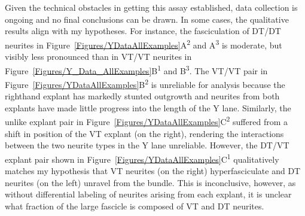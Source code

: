 Given the technical obstacles in getting this assay established, data collection is ongoing and no final conclusions can be drawn.
In some cases, the qualitative results align with my hypotheses.
For instance, the fasciculation of DT/DT neurites in Figure~\ref{Figures/YDataAllExamples}A\textsuperscript{2} and A\textsuperscript{3} is moderate, but visibly less pronounced than in VT/VT neurites in Figure~\ref{Figures/Y_Data_AllExamples}B\textsuperscript{1} and B\textsuperscript{3}.
The VT/VT pair in Figure~\ref{Figures/YDataAllExamples}B\textsuperscript{2} is unreliable for analysis because the righthand explant has markedly stunted outgrowth and neurites from both explants have made little progress into the length of the Y lane.
Similarly, the unlike explant pair in Figure~\ref{Figures/YDataAllExamples}C\textsuperscript{2} suffered from a shift in position of the VT explant (on the right), rendering the interactions between the two neurite types in the Y lane unreliable.
However, the DT/VT explant pair shown in Figure~\ref{Figures/YDataAllExamples}C\textsuperscript{1} qualitatively matches my hypothesis that VT neurites (on the right) hyperfasciculate and DT neurites (on the left) unravel from the bundle.
This is inconclusive, however, as without differential labeling of neurites arising from each explant, it is unclear what fraction of the large fascicle is composed of VT and DT neurites.

